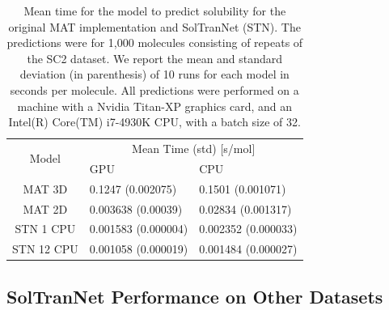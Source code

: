 \documentclass[journal=jcim,manuscript=applicationnotes]{achemso} %
\begin{document}
\begin{table}
    \begin{tabular}{|c|l|l|}
        \hline
        \multirow{2}{*}{Model}    & \multicolumn{2}{c|}{Mean Time (std) [s/mol]} \\ 
        \cline{2-3}
          &  GPU & CPU \\
         \hline
         MAT 3D & 0.1247 (0.002075) & 0.1501 (0.001071) \\
         MAT 2D & 0.003638 (0.00039) & 0.02834 (0.001317) \\
         STN 1 CPU & 0.001583 (0.000004) & 0.002352 (0.000033)\\
         STN 12 CPU & 0.001058 (0.000019) & 0.001484 (0.000027)\\
         \hline
    \end{tabular}
    \caption{Mean time for the model to predict solubility for the original MAT implementation and SolTranNet (STN). The predictions were for 1,000 molecules consisting of repeats of the SC2 dataset. We report the mean and standard deviation (in parenthesis) of 10 runs for each model in seconds per molecule. All predictions were performed on a machine with a Nvidia Titan-XP graphics card, and an Intel(R) Core(TM) i7-4930K CPU, with a batch size of 32.}
    \label{tab:timings}
\end{table}


\subsection{SolTranNet Performance on Other Datasets}
\end{document}
